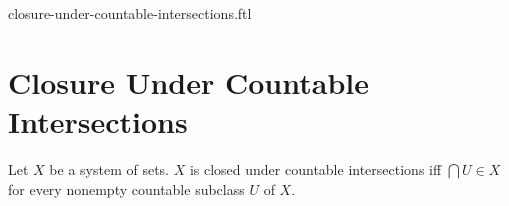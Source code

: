 \documentclass{naproche-library}
\begin{document}
\begin{smodule}{closure-under-countable-intersections.ftl}

  \section*{Closure Under Countable Intersections}

  \begin{definition}[forthel,id=FOUNDATIONS_14_451771879129088]
    Let $X$ be a system of sets.
    $X$ is closed under countable intersections iff $\bigcap U \in X$ for every nonempty countable subclass $U$ of $X$.
  \end{definition}
\end{smodule}
\end{document}
